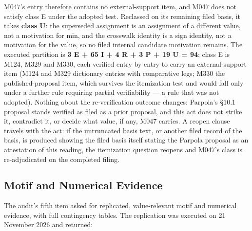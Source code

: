 \documentclass[11pt]{article}
\begin{document}
M047's entry therefore contains no external-support item, and
M047 does not satisfy class E under the adopted test. Reclassed
on its remaining filed basis, it takes \textbf{class U}: the
superseded assignment is an assignment of a different value,
not a motivation for mīn, and the crosswalk identity is a sign
identity, not a motivation for the value, so no filed internal
candidate motivation remains. The executed partition is
\textbf{3 E + 65 I + 4 R + 3 P + 19 U = 94}; class E is M124,
M329 and M330, each verified entry by entry to carry an
external-support item (M124 and M329 dictionary entries with
comparative legs; M330 the published-proposal item, which
survives the itemization test and would fall only under a
further rule requiring partial verifiability --- a rule that
was not adopted). Nothing about the re-verification outcome
changes: Parpola's §10.1 proposal stands verified as filed as a
prior proposal, and this act does not strike it, contradict it,
or decide what value, if any, M047 carries. A reopen clause
travels with the act: if the untruncated basis text, or another
filed record of the basis, is produced showing the filed basis
itself stating the Parpola proposal as an attestation of this
reading, the itemization question reopens and M047's class is
re-adjudicated on the completed filing.

\subsection{Motif and Numerical
Evidence}\label{appendix-d6-motif-numerical}

The audit's fifth item asked for replicated, value-relevant
motif and numerical evidence, with full contingency tables. The
replication was executed on 21 November 2026 and returned:
\end{document}
